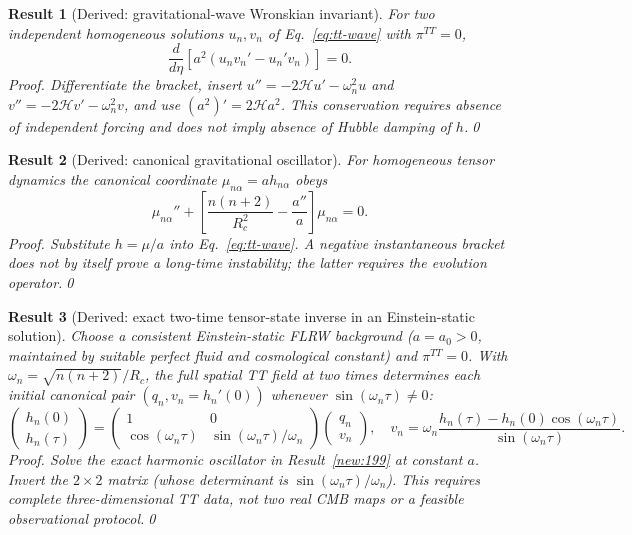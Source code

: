 \documentclass[aps,prd,onecolumn,notitlepage,groupedaddress,11pt]{revtex4-2}
\newtheorem{result}{Result}
\begin{document}
\begin{result}[\textsf{Derived}: gravitational-wave Wronskian invariant]\label{new:200}
For two independent homogeneous solutions $u_n,v_n$ of Eq.~\eqref{eq:tt-wave} with $\pi^{TT}=0$,
\begin{equation}\label{eq:tt-wronskian}
 \frac{d}{d\eta}\left[a^2(u_nv_n'-u_n'v_n)\right]=0.
\end{equation}
\textit{Proof.} Differentiate the bracket, insert $u''=-2\mathcal H u'-\omega_n^2u$ and $v''=-2\mathcal H v'-\omega_n^2v$, and use $(a^2)'=2\mathcal H a^2$. This conservation requires absence of independent forcing and does not imply absence of Hubble damping of $h$.\qed
\end{result}

\begin{result}[\textsf{Derived}: canonical gravitational oscillator]\label{new:201}
For homogeneous tensor dynamics the canonical coordinate $\mu_{n\alpha}=a h_{n\alpha}$ obeys
\begin{equation}\label{eq:tt-mu}
 \mu_{n\alpha}''+\left[\frac{n(n+2)}{R_c^2}-\frac{a''}{a}\right]\mu_{n\alpha}=0.
\end{equation}
\textit{Proof.} Substitute $h=\mu/a$ into Eq.~\eqref{eq:tt-wave}. A negative instantaneous bracket does not by itself prove a long-time instability; the latter requires the evolution operator.\qed
\end{result}

\begin{result}[\textsf{Derived}: exact two-time tensor-state inverse in an Einstein-static solution]\label{new:202}
Choose a consistent Einstein-static FLRW background ($a=a_0>0$, maintained by suitable perfect fluid and cosmological constant) and $\pi^{TT}=0$. With $\omega_n=\sqrt{n(n+2)}/R_c$, the full spatial TT field at two times determines each initial canonical pair $(q_n,v_n=h_n'(0))$ whenever $\sin(\omega_n\tau)\ne0$:
\begin{equation}\label{eq:tt-two-samples}
 \begin{pmatrix}h_n(0)\\h_n(\tau)\end{pmatrix}
 =\begin{pmatrix}1&0\\\cos(\omega_n\tau)&\sin(\omega_n\tau)/\omega_n\end{pmatrix}
 \begin{pmatrix}q_n\\v_n\end{pmatrix},\quad
 v_n=\omega_n\frac{h_n(\tau)-h_n(0)\cos(\omega_n\tau)}{\sin(\omega_n\tau)}.
\end{equation}
\textit{Proof.} Solve the exact harmonic oscillator in Result~\ref{new:199} at constant $a$. Invert the $2\times2$ matrix (whose determinant is $\sin(\omega_n\tau)/\omega_n$). This requires \emph{complete three-dimensional TT data}, not two real CMB maps or a feasible observational protocol.\qed
\end{result}
\end{document}
